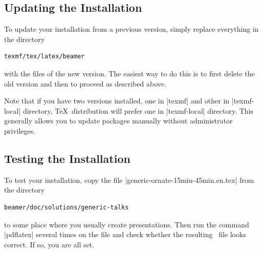 \subsection{Updating the Installation}

To update your installation from a previous version, simply replace everything in the directory
\begin{verbatim}
texmf/tex/latex/beamer
\end{verbatim}
with the files of the new version. The easiest way to do this is to first delete the old version and then to proceed as described above.

Note that if you have two versions installed, one in |texmf| and other in |texmf-local| directory, \TeX\ distribution will prefer one in |texmf-local| directory. This generally allows you to update packages manually without administrator privileges.


\subsection{Testing the Installation}

To test your installation, copy the file |generic-ornate-15min-45min.en.tex| from the directory
\begin{verbatim}
beamer/doc/solutions/generic-talks
\end{verbatim}
to some place where you usually create presentations. Then run the command |pdflatex| several times on the file and check whether the resulting \pdf\ file looks correct. If so, you are all set.




